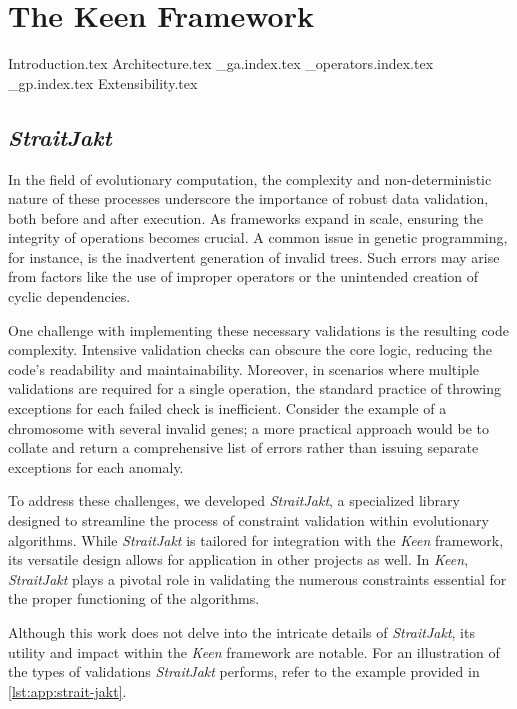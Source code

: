 
\chapter{The Keen Framework}
\label{chap:keen}
    {Introduction.tex}
    {Architecture.tex}
    {_ga.index.tex}
    {_operators.index.tex}
    {_gp.index.tex}
    {Extensibility.tex}

    \section{\textit{StraitJakt}}
        In the field of evolutionary computation, the complexity and non-deterministic nature of these processes 
        underscore the importance of robust data validation, both before and after execution. As frameworks expand in 
        scale, ensuring the integrity of operations becomes crucial. A common issue in genetic programming, for 
        instance, is the inadvertent generation of invalid trees. Such errors may arise from factors like the use of 
        improper operators or the unintended creation of cyclic dependencies.

        One challenge with implementing these necessary validations is the resulting code complexity. Intensive 
        validation checks can obscure the core logic, reducing the code's readability and maintainability. Moreover, in 
        scenarios where multiple validations are required for a single operation, the standard practice of throwing 
        exceptions for each failed check is inefficient. Consider the example of a chromosome with several invalid 
        genes; a more practical approach would be to collate and return a comprehensive list of errors rather than 
        issuing separate exceptions for each anomaly.

        To address these challenges, we developed \textit{StraitJakt}, a specialized library designed to streamline the 
        process of constraint validation within evolutionary algorithms. While \textit{StraitJakt} is tailored for 
        integration with the \textit{Keen} framework, its versatile design allows for application in other projects as 
        well. In \textit{Keen}, \textit{StraitJakt} plays a pivotal role in validating the numerous constraints 
        essential for the proper functioning of the algorithms. 

        Although this work does not delve into the intricate details of \textit{StraitJakt}, its utility and impact 
        within the \textit{Keen} framework are notable. For an illustration of the types of validations 
        \textit{StraitJakt} performs, refer to the example provided in \vref{lst:app:strait-jakt}.
        